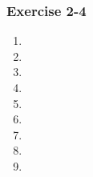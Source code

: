 {\begin{multicols}{3}
\subsubsection*{Exercise 2-4} %
\begin{enumerate}[noitemsep, label=\textbf{\arabic*}. ] 
\item %
\item %
\item %
\item %
\item %
\item %
\item %
\item %
\item %
       
\end{enumerate}

\end{multicols}}
